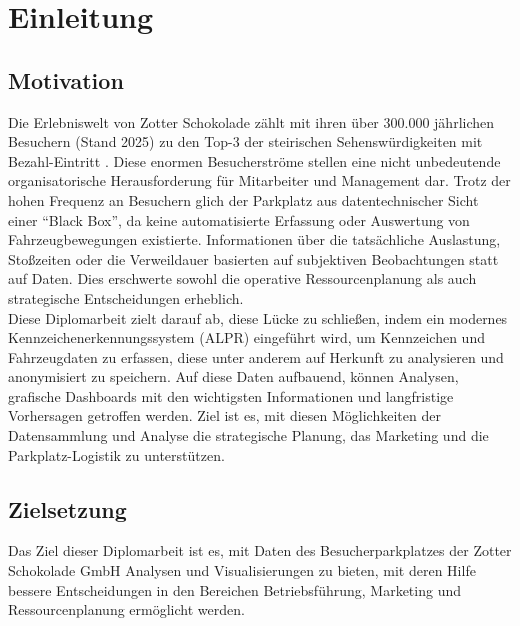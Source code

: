 \section{Einleitung}
\label{sec:einleitung}

\subsection{Motivation}
\label{sec:motivation}

Die Erlebniswelt von Zotter Schokolade zählt mit ihren über 300.000 jährlichen Besuchern (Stand 2025) zu den Top-3 der steirischen Sehenswürdigkeiten mit Bezahl-Eintritt \cite{steiermark_ausflugsziele}.
Diese enormen Besucherströme stellen eine nicht unbedeutende organisatorische Herausforderung für Mitarbeiter und Management dar.
Trotz der hohen Frequenz an Besuchern glich der Parkplatz aus datentechnischer Sicht einer "`Black Box"', da keine automatisierte Erfassung oder Auswertung von Fahrzeugbewegungen existierte.
Informationen über die tatsächliche Auslastung, Stoßzeiten oder die Verweildauer basierten auf subjektiven Beobachtungen statt auf Daten.
Dies erschwerte sowohl die operative Ressourcenplanung als auch strategische Entscheidungen erheblich. \\
Diese Diplomarbeit zielt darauf ab, diese Lücke zu schließen, indem ein modernes Kennzeichenerkennungssystem (ALPR) eingeführt wird, um Kennzeichen und Fahrzeugdaten zu erfassen, diese unter anderem auf Herkunft zu analysieren und anonymisiert zu speichern.
Auf diese Daten aufbauend, können Analysen, grafische Dashboards mit den wichtigsten Informationen und langfristige Vorhersagen getroffen werden.
Ziel ist es, mit diesen Möglichkeiten der Datensammlung und Analyse die strategische Planung, das Marketing und die Parkplatz-Logistik zu unterstützen.

\newpage
\subsection{Zielsetzung}
\label{sec:zielsetzung}

Das Ziel dieser Diplomarbeit ist es, mit Daten des Besucherparkplatzes der Zotter Schokolade GmbH Analysen und Visualisierungen zu bieten, mit deren Hilfe bessere Entscheidungen in den Bereichen Betriebsführung, Marketing und Ressourcenplanung ermöglicht werden.

